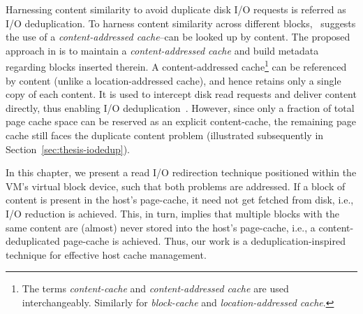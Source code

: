 Harnessing content similarity 
to avoid duplicate disk I/O requests %
is referred as I/O deduplication.
To harness content similarity across different blocks,~\cite{iodedup} 
suggests the use of a 
\textit{content-addressed cache}--can be looked up by content.
The proposed approach in \cite{iodedup} is to
maintain a \textit{content-addressed cache} and build 
metadata 
regarding blocks inserted therein. 
A content-addressed cache\footnote{The terms 
\textit{content-cache} and \textit{content-addressed cache} are used 
interchangeably. Similarly for \textit{block-cache} and 
\textit{location-addressed cache}.}
can be referenced by content 
(unlike a location-addressed cache), and hence 
retains only a single copy of each content. 
It is used to intercept disk read
requests and deliver content directly, 
thus enabling I/O deduplication~\cite{iodedup}.
However, since only a fraction of total page cache space can be reserved
as an explicit content-cache, the remaining page cache still faces the
duplicate content problem (illustrated 
subsequently in Section~\ref{sec:thesis-iodedup}).


In this chapter, we present a read I/O redirection technique positioned within
the VM's virtual block device, such that both problems are 
addressed. If a block of content is present in the host's page-cache,
it need not get fetched from disk, i.e., I/O reduction is 
achieved. This, in turn, implies that multiple blocks with the same content 
are (almost) never stored into the host's page-cache, i.e., 
a content-deduplicated page-cache is achieved. 
Thus, our work is a deduplication-inspired technique for effective host
cache management.

